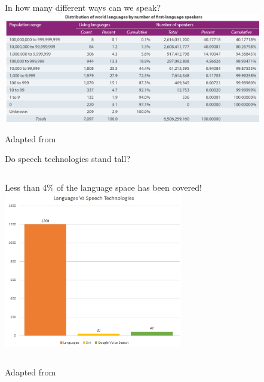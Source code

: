 \begin{frame}{In how many different ways can we speak?}
\includegraphics[height=48mm]{figures/languages}
\begin{center}
\tiny{Adapted from \cite{ETH}}
\end{center}
\end{frame}

\begin{frame}{Do speech technologies stand tall?}
\begin{columns}[T]
    \column{1.4in}
     \vspace{2.5cm}
     \alert{Less than 4\%} of the language space has been covered!
     \column{2.8in}
     \includegraphics[height=68mm]{figures/lan_tech}
  \end{columns}
\begin{center}
\tiny{Adapted from \cite{SRI,GVS}}
\end{center}
\end{frame}


